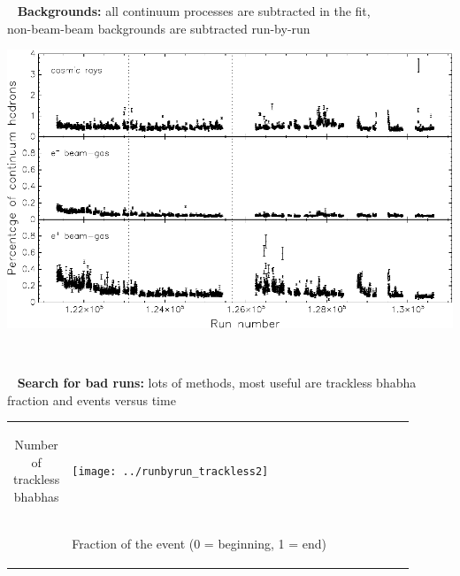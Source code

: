 \documentclass[landscape]{article}
\newenvironment{slide}{\mbox{ }\vfill}{\vfill \mbox{ } \pagebreak}
\begin{document}
\begin{slide}
{\bf Backgrounds:} all continuum processes are subtracted in the fit, \\
non-beam-beam backgrounds are subtracted run-by-run

\vfill
\begin{center}
  \includegraphics[width=0.9\linewidth]{backgrounds}
\end{center}

\end{slide}

\begin{slide}
{\bf Search for bad runs:} lots of methods, most useful are trackless
bhabha fraction and events versus time

\vfill
\begin{center}
  \begin{tabular}{c p{0.9\linewidth}}
    \begin{rotate}{90}\mbox{\hspace{2 cm}} Number of trackless bhabhas\end{rotate} & \texttt{[image: ../runbyrun\_trackless2]} \\
    & \vspace{-1 cm} \begin{center} Fraction of the event (0 = beginning, 1 = end) \end{center}
  \end{tabular}
\end{center}
\end{slide}
\end{document}
